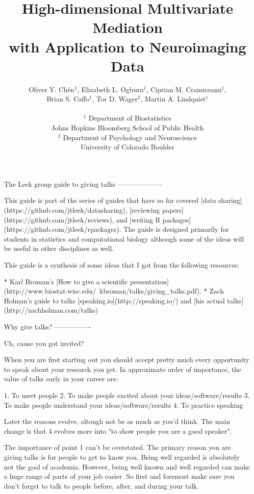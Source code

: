 \documentclass[12pt]{article}
\title{High-dimensional Multivariate Mediation\\
 with Application to Neuroimaging Data}
\author{
Oliver Y. Ch\'en$^1$,  Elizabeth L. Ogburn$^1$, Ciprian M. Crainiceanu$^1$,\\ Brian S. Caffo$^1$, Tor D. Wager$^2$, Martin A. Lindquist$^1$ \\ \\
$^1$ Department of Biostatistics\\
\bigskip
Johns Hopkins Bloomberg School of Public Health \\ 
$^2$ Department of Psychology and Neuroscience\\
University of Colorado Boulder
}
\date{}
\begin{document}

\baselineskip24pt


\maketitle 

The Leek group guide to giving talks
--------------------

This guide is part of the series of guides that have so far covered [data sharing](https://github.com/jtleek/datasharing), [reviewing papers](https://github.com/jtleek/reviews), and [writing R packages](https://github.com/jtleek/rpackages). The guide is designed primarily for students in statistics and computational biology although some of the ideas will be useful in other disciplines as well.

This guide is a synthesis of some ideas that I got from the following resources:

* Karl Broman's [How to give a scientific presentation](http://www.biostat.wisc.edu/~kbroman/talks/giving_talks.pdf). 
* Zach Holman's guide to talks [speaking.io](http://speaking.io/) and [his actual talks](http://zachholman.com/talks)


Why give talks?
----------------

Uh, cause you got invited?

When you are first starting out you should accept pretty much every opportunity to speak about your research you get. In approximate order of importance, the value of talks early in your career are:

1. To meet people
2. To make people excited about your ideas/software/results
3. To make people understand your ideas/software/results
4. To practice speaking

Later the reasons evolve, altough not be as much as you'd think. The main change is that 4 evolves more into "to show people you are a good speaker". 

The importance of point 1 can't be overstated. The primary reason you are giving talks is for people to get to know you. Being well regarded is absolutely not the goal of academia. However, being well known and well regarded can make a huge range of parts of your job easier. So first and foremost make sure you don't forget to talk to people before, after, and during your talk. 
\end{document}

